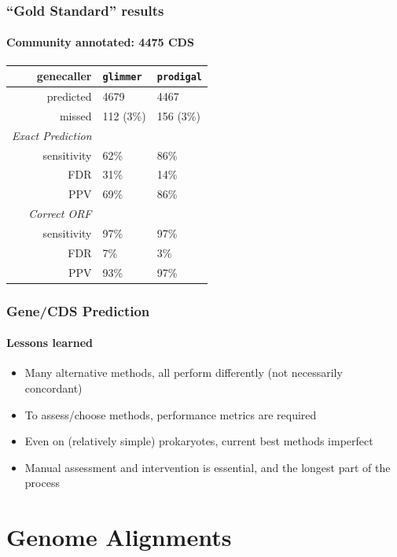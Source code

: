 \documentclass[table]{beamer}
\begin{document}
    \begin{frame}
     \frametitle{``Gold Standard'' results}
     \framesubtitle{Community annotated: 4475 CDS}
    \begin{center}
	\begin{tabular}{r|l|l}
	  genecaller & \texttt{glimmer} & \texttt{prodigal}  \\
	  \hline
	  predicted & 4679    & 4467  \\
	  missed & 112 (3\%)   & 156 (3\%)  \\
	  \hline
	  \emph{Exact Prediction} & & \\
  	  sensitivity   & 62\%   & 86\%  \\
  	  FDR   & 31\%   & 14\%  \\  
	  PPV   & 69\% & 86\%  \\  
	  \hline
	  \emph{Correct ORF} & & \\
  	  sensitivity   & 97\%   & 97\% \\
  	  FDR   & 7\%  & 3\% \\  
	  PPV   & 93\% & 97\%  \\  
	\end{tabular}
	\end{center}     
   \end{frame}

    \begin{frame}
      \frametitle{Gene/CDS Prediction}   
      \framesubtitle{Lessons learned}   
      \begin{itemize}
        \item Many alternative methods, all perform differently (not necessarily concordant)
        \item To assess/choose methods, performance metrics are required
        \item Even on (relatively simple) prokaryotes, current best methods imperfect
        \item Manual assessment and intervention is essential, and the longest part of the process
      \end{itemize}
    \end{frame}
    
    
\section{Genome Alignments}
\end{document}
